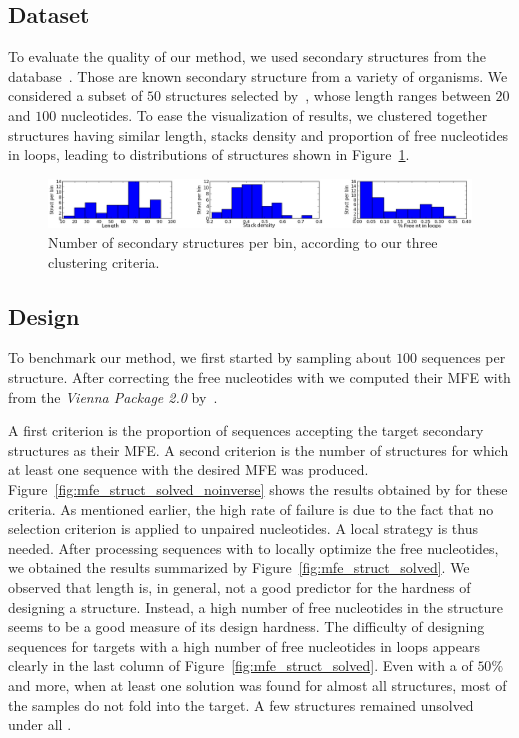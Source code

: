\subsection{Dataset}
To evaluate the quality of our method, we used secondary
structures from the \RNASTRAND database~\citep{andronescu2008rna}.
Those are known secondary structure from a variety of organisms.
We considered a subset of $50$ structures selected by~\cite{Levin:2012kx}, 
whose length ranges between $20$ and $100$ nucleotides. 
 To ease the visualization of results, we clustered together structures
 having similar length, stacks density and proportion of free nucleotides in loops, leading to distributions of structures shown in Figure~\ref{fig:bins}.

 \begin{figure}[ht!]
 	\centering
	\includegraphics[width=\textwidth]{Figures/bins_distribution.png}
	\caption{Number of secondary structures per bin, according to our three clustering criteria.}
	\label{fig:bins}
 \end{figure}
 
 
\subsection{Design}
 To benchmark our method, we first started by sampling about $100$ sequences per structure. After correcting the free nucleotides with
 \RNAinverse we computed their MFE with \rnafold from the \textit{Vienna Package 2.0} by~\cite{Hofacker:1994}.
 
A first criterion is the proportion of sequences accepting the target
secondary structures as their MFE. A second criterion is the number of structures
for which at least one sequence with the desired MFE was produced.
Figure~\ref{fig:mfe_struct_solved_noinverse} shows the results obtained by \ourprog for these criteria. As mentioned earlier, the high rate of failure
is due to the fact that no selection criterion is applied to
unpaired nucleotides. A local strategy is thus needed.
After processing \ourprog sequences with \RNAinverse to 
locally optimize the free nucleotides, we obtained the results 
summarized by Figure~\ref{fig:mfe_struct_solved}. We observed
that length is, in general, not a good predictor for the hardness of designing a structure. 
Instead, a high number of free nucleotides in the structure seems to be a 
good measure of its design hardness. 
 The difficulty of 
designing sequences for targets with a high number of free nucleotides 
 in loops appears clearly in the last column of Figure~\ref{fig:mfe_struct_solved}.
Even with a \GCContent of $50\%$ and more, when at least
one solution was found for almost all structures, most of the samples 
do not fold into the target. A few structures remained unsolved under
all \GCContent.


